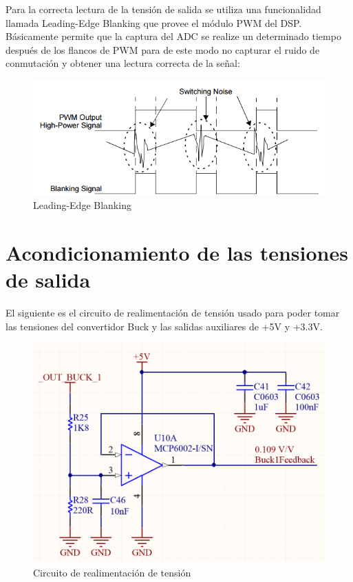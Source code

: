 \documentclass[12pt]{report}
\begin{document}
Para la correcta lectura de la tensión de salida se utiliza una funcionalidad llamada Leading-Edge Blanking que provee el módulo PWM del DSP. Básicamente permite que la captura del ADC se realize un determinado tiempo después de los flancos de PWM para de este modo no capturar el ruido de conmutación y obtener una lectura correcta de la señal:

\begin{figure}[H]
	\centering
	\includegraphics[width=\textwidth,height=\textheight,keepaspectratio]{leading-edge-blanking}
	\caption{Leading-Edge Blanking}
\end{figure}


\section{Acondicionamiento de las tensiones de salida} \label{acondicionamiento-tensiones}

El siguiente es el circuito de realimentación de tensión usado para poder tomar las tensiones del convertidor Buck y las salidas auxiliares de +5V y +3.3V.

\begin{figure}[H]
	\centering
	\includegraphics[width=\textwidth,height=\textheight,keepaspectratio]{voltage_feedback}
	\caption{Circuito de realimentación de tensión}
	\label{voltage_feedback_circuit}
\end{figure}
\end{document}
